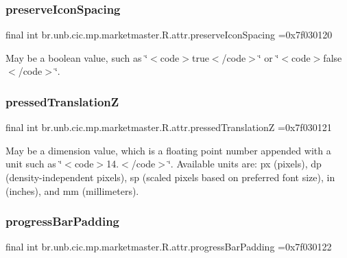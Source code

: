 \subsubsection{\texorpdfstring{preserve\+Icon\+Spacing}{preserveIconSpacing}}
{\footnotesize\ttfamily final int br.\+unb.\+cic.\+mp.\+marketmaster.\+R.\+attr.\+preserve\+Icon\+Spacing =0x7f030120\hspace{0.3cm}{\ttfamily [static]}}

May be a boolean value, such as \char`\"{}$<$code$>$true$<$/code$>$\char`\"{} or \char`\"{}$<$code$>$false$<$/code$>$\char`\"{}. \mbox{\label{classbr_1_1unb_1_1cic_1_1mp_1_1marketmaster_1_1R_1_1attr_a4e730e646e2c38ab7fbadcfaabd5ee60}} 
\subsubsection{\texorpdfstring{pressed\+TranslationZ}{pressedTranslationZ}}
{\footnotesize\ttfamily final int br.\+unb.\+cic.\+mp.\+marketmaster.\+R.\+attr.\+pressed\+TranslationZ =0x7f030121\hspace{0.3cm}{\ttfamily [static]}}

May be a dimension value, which is a floating point number appended with a unit such as \char`\"{}$<$code$>$14.\+5sp$<$/code$>$\char`\"{}. Available units are\+: px (pixels), dp (density-\/independent pixels), sp (scaled pixels based on preferred font size), in (inches), and mm (millimeters). \mbox{\label{classbr_1_1unb_1_1cic_1_1mp_1_1marketmaster_1_1R_1_1attr_af4de6bdde71c03943766f260bf692d24}} 
\subsubsection{\texorpdfstring{progress\+Bar\+Padding}{progressBarPadding}}
{\footnotesize\ttfamily final int br.\+unb.\+cic.\+mp.\+marketmaster.\+R.\+attr.\+progress\+Bar\+Padding =0x7f030122\hspace{0.3cm}{\ttfamily [static]}}

